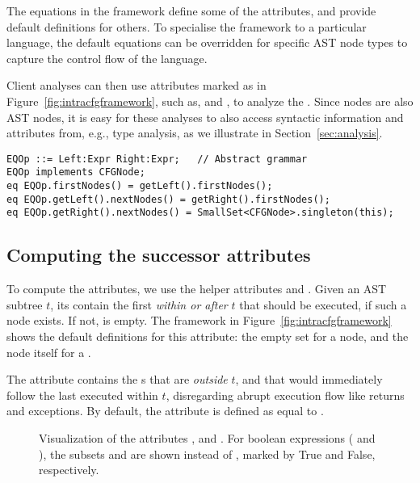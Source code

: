 The equations in the framework define some of the attributes, and provide default definitions for others.
To specialise the framework to a particular language, the default equations can be overridden for specific AST node types to capture the control flow of the language.

Client analyses can then use attributes marked as  {\dfapi} in Figure~\ref{fig:intracfgframework}, such as,  and , to analyze the {\CFG}.
Since {\CFG} nodes are also AST nodes, it is easy for these analyses to also access syntactic information and attributes from, e.g., type analysis,
as we illustrate in Section~\ref{sec:analysis}.


\begin{lstlisting}[language=JastAdd, caption=JastAdd translation of \astnode{EQOp} in Figure~\ref{fig:exampleuml}., label=listing:jastadd-eqop, captionpos=b,float=t]
EQOp ::= Left:Expr Right:Expr;   // Abstract grammar
EQOp implements CFGNode;
eq EQOp.firstNodes() = getLeft().firstNodes();
eq EQOp.getLeft().nextNodes() = getRight().firstNodes();
eq EQOp.getRight().nextNodes() = SmallSet<CFGNode>.singleton(this);
\end{lstlisting}

\subsection{Computing the successor attributes}

To compute the  attributes, we use the helper attributes  and .
Given an AST subtree $t$, its  contain the first  \emph{within or after} $t$ that should be executed, if such a node exists.
If not,  is empty.
The framework in Figure~\ref{fig:intracfgframework} shows the default definitions for this attribute: the empty set for a  node, and the node itself for a .

The  attribute contains the s that are \emph{outside} $t$, and that would immediately follow the last executed  within $t$, disregarding abrupt execution flow like returns and exceptions.
By default, the  attribute is defined as equal to .

\begin{figure*}
\centering
\scalebox{0.59}{
	
}
\caption{Visualization of the attributes ,  and . For boolean expressions ( and ), the subsets  and  are shown instead of , marked by True and False, respectively.}
\label{fig:RunningExample}
\end{figure*}


